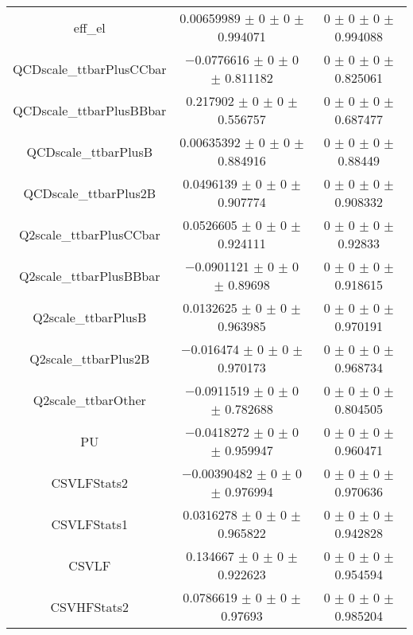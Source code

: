 \begin{table}
\begin{tabular}{ccc}
eff\_el & \num{0.00659989} $\pm$ \num{0} $\pm$ \num{0} $\pm$ \num{0.994071} & \num{0} $\pm$ \num{0} $\pm$ \num{0} $\pm$ \num{0.994088}\\
QCDscale\_ttbarPlusCCbar & \num{-0.0776616} $\pm$ \num{0} $\pm$ \num{0} $\pm$ \num{0.811182} & \num{0} $\pm$ \num{0} $\pm$ \num{0} $\pm$ \num{0.825061}\\
QCDscale\_ttbarPlusBBbar & \num{0.217902} $\pm$ \num{0} $\pm$ \num{0} $\pm$ \num{0.556757} & \num{0} $\pm$ \num{0} $\pm$ \num{0} $\pm$ \num{0.687477}\\
QCDscale\_ttbarPlusB & \num{0.00635392} $\pm$ \num{0} $\pm$ \num{0} $\pm$ \num{0.884916} & \num{0} $\pm$ \num{0} $\pm$ \num{0} $\pm$ \num{0.88449}\\
QCDscale\_ttbarPlus2B & \num{0.0496139} $\pm$ \num{0} $\pm$ \num{0} $\pm$ \num{0.907774} & \num{0} $\pm$ \num{0} $\pm$ \num{0} $\pm$ \num{0.908332}\\
Q2scale\_ttbarPlusCCbar & \num{0.0526605} $\pm$ \num{0} $\pm$ \num{0} $\pm$ \num{0.924111} & \num{0} $\pm$ \num{0} $\pm$ \num{0} $\pm$ \num{0.92833}\\
Q2scale\_ttbarPlusBBbar & \num{-0.0901121} $\pm$ \num{0} $\pm$ \num{0} $\pm$ \num{0.89698} & \num{0} $\pm$ \num{0} $\pm$ \num{0} $\pm$ \num{0.918615}\\
Q2scale\_ttbarPlusB & \num{0.0132625} $\pm$ \num{0} $\pm$ \num{0} $\pm$ \num{0.963985} & \num{0} $\pm$ \num{0} $\pm$ \num{0} $\pm$ \num{0.970191}\\
Q2scale\_ttbarPlus2B & \num{-0.016474} $\pm$ \num{0} $\pm$ \num{0} $\pm$ \num{0.970173} & \num{0} $\pm$ \num{0} $\pm$ \num{0} $\pm$ \num{0.968734}\\
Q2scale\_ttbarOther & \num{-0.0911519} $\pm$ \num{0} $\pm$ \num{0} $\pm$ \num{0.782688} & \num{0} $\pm$ \num{0} $\pm$ \num{0} $\pm$ \num{0.804505}\\
PU & \num{-0.0418272} $\pm$ \num{0} $\pm$ \num{0} $\pm$ \num{0.959947} & \num{0} $\pm$ \num{0} $\pm$ \num{0} $\pm$ \num{0.960471}\\
CSVLFStats2 & \num{-0.00390482} $\pm$ \num{0} $\pm$ \num{0} $\pm$ \num{0.976994} & \num{0} $\pm$ \num{0} $\pm$ \num{0} $\pm$ \num{0.970636}\\
CSVLFStats1 & \num{0.0316278} $\pm$ \num{0} $\pm$ \num{0} $\pm$ \num{0.965822} & \num{0} $\pm$ \num{0} $\pm$ \num{0} $\pm$ \num{0.942828}\\
CSVLF & \num{0.134667} $\pm$ \num{0} $\pm$ \num{0} $\pm$ \num{0.922623} & \num{0} $\pm$ \num{0} $\pm$ \num{0} $\pm$ \num{0.954594}\\
CSVHFStats2 & \num{0.0786619} $\pm$ \num{0} $\pm$ \num{0} $\pm$ \num{0.97693} & \num{0} $\pm$ \num{0} $\pm$ \num{0} $\pm$ \num{0.985204}\\

\end{tabular}
\end{table}
